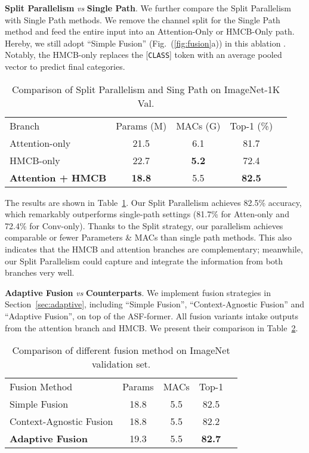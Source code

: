 \documentclass[lettersize,journal]{IEEEtran}
\begin{document}
\textbf{Split Parallelism} \textit{vs} \textbf{Single Path}. We further compare the Split Parallelism with Single Path methods. We remove the channel split for the Single Path method and feed the entire input into an Attention-Only or HMCB-Only path. Hereby,  we still adopt ``Simple Fusion'' (Fig.~(\ref{fig:fusion}a)) in this ablation . Notably, the HMCB-only replaces the [{\tt CLASS}] token with an average pooled vector to predict final categories.
\setlength{\tabcolsep}{4pt}
\begin{table}[th]
\begin{center}
\caption{Comparison of Split Parallelism and Sing Path on ImageNet-1K Val.}
\label{table:branch}
\begin{tabular}{lcccc}
\hline\noalign{\smallskip}
Branch &Params (M)&MACs (G)&Top-1 (\%)\\
\noalign{\smallskip}
\hline
\noalign{\smallskip}
Attention-only & 21.5 & 6.1 & 81.7\\
HMCB-only & 22.7 & \textbf{5.2} & 72.4\\
\textbf{Attention + HMCB}& \textbf{18.8} & 5.5 & \textbf{82.5} \\
\hline
\end{tabular}
\end{center}
\end{table}
\setlength{\tabcolsep}{1.4pt}

The results are shown in Table~\ref{table:branch}. Our Split Parallelism achieves 82.5\% accuracy, which remarkably outperforms single-path settings (81.7\% for Atten-only and 72.4\% for Conv-only). Thanks to the Split strategy, our parallelism achieves comparable or fewer Parameters \& MACs than single path methods. This also indicates that the HMCB and attention branches are complementary; meanwhile, our Split Parallelism could capture and integrate the information from both branches very well.

\textbf{Adaptive Fusion} \textit{vs} \textbf{Counterparts}. We implement fusion strategies in Section~\ref{sec:adaptive}, including ``Simple Fusion'', ``Context-Agnostic Fusion'' and ``Adaptive Fusion'', on top of the ASF-former. All fusion variants intake outputs from the attention branch and HMCB. We present their comparison in Table~\ref{table:fusion}.
\setlength{\tabcolsep}{4pt}
\begin{table}[th]
\begin{center}
\caption{Comparison of different fusion method on ImageNet validation set.}
\label{table:fusion}
\begin{tabular}{lcccc}
\hline\noalign{\smallskip}
Fusion Method &Params &MACs &Top-1\\
\noalign{\smallskip}
\hline
\noalign{\smallskip}
Simple Fusion & 18.8 & 5.5 & 82.5 \\
Context-Agnostic Fusion & 18.8 & 5.5 & 82.2 \\
\textbf{Adaptive Fusion} & 19.3 & 5.5 & \textbf{82.7} \\
\hline
\end{tabular}
\end{center}
\end{table}
\setlength{\tabcolsep}{1.4pt}
\end{document}

